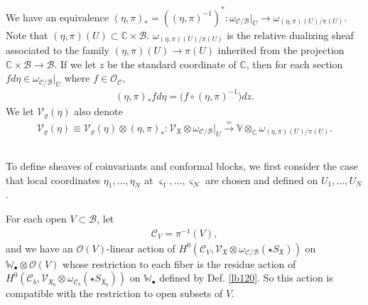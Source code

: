 \documentclass[11pt,b5paper,notitlepage]{article}
\theoremstyle{definition}
\theoremstyle{plain}
\newcommand{\fk}{\mathfrak}
\newcommand{\mc}{\mathcal}
\newcommand{\scr}{\mathscr}
\newcommand{\sgm}{\varsigma}
\newcommand{\SX}{{S_{\fk X}}}
\newcommand{\blt}{\bullet}
\newcommand{\Vbb}{\mathbb V}
\newcommand{\Wbb}{\mathbb W}
\newcommand{\Cbb}{\mathbb C}
\newcommand{\SXb}{{S_{\fk X_b}}}
\numberwithin{equation}{section}
\begin{document}
We have an equivalence $(\eta,\pi)_*=((\eta,\pi)^{-1})^*:\omega_{\mc C/\mc B}|_U\rightarrow \omega_{(\eta,\pi)(U)/\pi(U)}$. Note that $(\eta,\pi)(U)\subset \Cbb\times\mc B$. $\omega_{(\eta,\pi)(U)/\pi(U)}$ is the relative dualizing sheaf associated to the family $(\eta,\pi)(U)\rightarrow\pi(U)$ inherited from the projection $\Cbb\times\mc B\rightarrow\mc B$. If we let $z$ be the standard coordinate of $\Cbb$, then for each section $fd\eta\in\omega_{\mc C/\mc B}|_U$ where $f\in\scr O_{\mc C}$,
\begin{align*}
(\eta,\pi)_*fd\eta=\big(f\circ(\eta,\pi)^{-1}\big)dz.
\end{align*}
We let $\mc V_\varrho(\eta)$ also denote
\begin{align}
\mc V_\varrho(\eta)\equiv\mc V_\varrho(\eta)\otimes (\eta,\pi)_*:\scr V_{\fk X}\otimes\omega_{\mc C/\mc B}\big|_U\xrightarrow{\simeq} \Vbb\otimes_\Cbb\omega_{(\eta,\pi)(U)/\pi(U)}.\label{eq219}
\end{align}








\subsection{}


To define sheaves of coinvariants and conformal blocks, we first consider the case that local coordinates $\eta_1,\dots,\eta_N$ at $\sgm_1,\dots,\sgm_N$ are chosen and defined on $U_1,\dots,U_N$.

For each open $V\subset\mc B$, let \index{CV@$\mc C_V=\pi^{-1}(V)$}
\begin{align}
\mc C_V=\pi^{-1}(V),
\end{align}
and we have an $\scr O(V)$-linear action of $H^0(\mc C_V,\scr V_{\fk X}\otimes\omega_{\mc C/\mc B}(\star\SX))$ on $\Wbb_\blt\otimes\scr O(V)$ whose restriction to each fiber is the residue action of $H^0(\mc C_b,\scr V_{\fk X_b}\otimes\omega_{\mc C_b}(\star\SXb))$ on $\Wbb_\blt$ defined by Def. \ref{lb120}. So this action is compatible with the restriction to open subsets of $V$.
\end{document}
